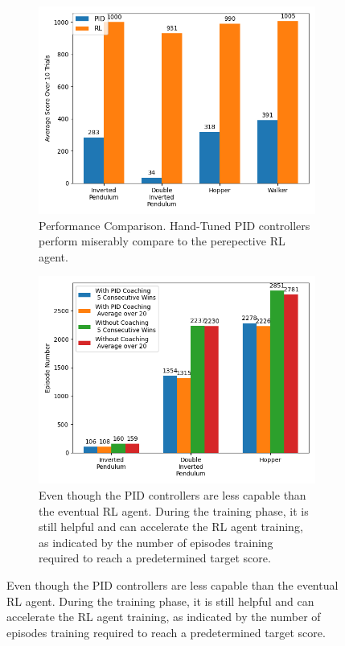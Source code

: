 \documentclass[journal]{IEEEtran}
\begin{document}
\begin{figure}
\centering
\begin{subfigure}{0.25\textwidth}
  \centering
  \includegraphics[width=\linewidth]{PIDvsRL.png}
  \caption{Performance Comparison. Hand-Tuned PID controllers perform miserably compare to the perepective RL agent.}
  \label{fig:pid}
\end{subfigure}%
\begin{subfigure}{.25\textwidth}
  \centering
  \includegraphics[width=\linewidth]{compare.png}
  \caption{Even though the PID controllers are less capable than the eventual RL agent. During the training phase, it is still helpful and can accelerate the RL agent training, as indicated by the number of episodes training required to reach a predetermined target score.}
  \label{fig:comparison}
\end{subfigure}
\end{figure}
\end{document}
